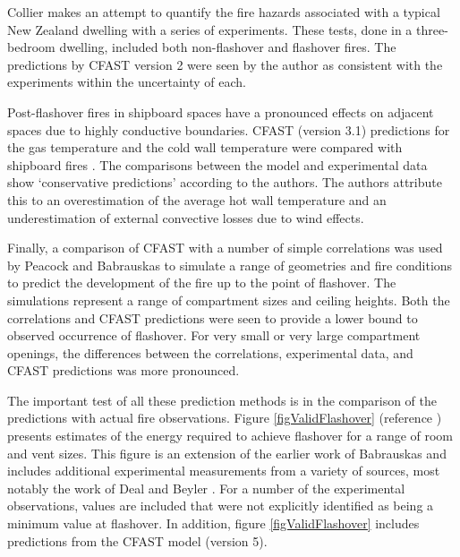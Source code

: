 Collier \cite{Valid:Collier} makes an attempt to quantify the fire hazards associated with a typical New Zealand dwelling with a series of experiments. These tests, done in a three-bedroom dwelling, included both non-flashover and flashover fires. The predictions by CFAST version 2 were seen by the author as consistent with the experiments within the uncertainty of each.

Post-flashover fires in shipboard spaces have a pronounced effects on adjacent spaces due to highly conductive boundaries. CFAST (version 3.1) predictions for the gas temperature and the cold wall temperature were compared with shipboard fires \cite{Valid:White}. The comparisons between the model and experimental data show `conservative predictions' according to the authors. The authors attribute this to an overestimation of the average hot wall temperature and an underestimation of external convective losses due to wind effects.

Finally, a comparison of CFAST with a number of simple correlations was used by Peacock and Babrauskas \cite{Valid:Peacock_Flashover_1,Valid:Peacock_Flashover_2} to simulate a range of geometries and fire conditions to predict the development of the fire up to the point of flashover. The simulations represent a range of compartment sizes and ceiling heights. Both the correlations and CFAST predictions were seen to provide a lower bound to observed occurrence of flashover. For very small or very large compartment openings, the differences between the correlations, experimental data, and CFAST predictions was more pronounced.

The important test of all these prediction methods is in the comparison of the predictions with actual fire observations. Figure \ref{figValidFlashover} (reference \cite{Valid:Peacock_Flashover_2}) presents estimates of the energy required to achieve flashover for a range of room and vent sizes. This figure is an extension of the earlier work of Babrauskas  \cite{Valid:Babrauskas_Flashover} and includes additional experimental measurements from a variety of sources, most notably the work of Deal and Beyler \cite{Valid:DealandBeyler}. For a number of the experimental observations, values are included that were not explicitly identified as being a minimum value at flashover. In addition, figure \ref{figValidFlashover} includes predictions from the CFAST model (version 5).

